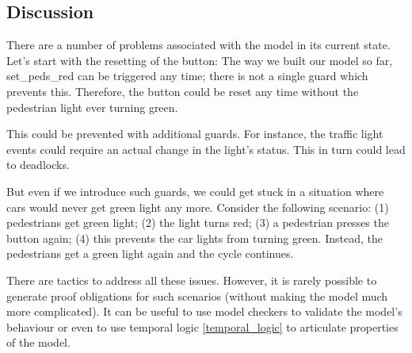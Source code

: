 \subsection{Discussion}
\label{tut_concepts_discussion2}

There are a number of problems associated with the model in its current state.  Let's start with the resetting of the button: The way we built our model so far, \textsf{set\_peds\_red} can be triggered any time; there is not a single guard which prevents this.  Therefore, the button could be reset any time without the pedestrian light ever turning green.

This could be prevented with additional guards. For instance, the traffic light events could require an actual change in the light's status.  This in turn could lead to deadlocks.

But even if we introduce such guards, we could get stuck in a situation where cars would never get green light any more.  Consider the following scenario: (1) pedestrians get green light; (2) the light turns red; (3) a pedestrian presses the button again; (4) this prevents the car lights from turning green. Instead, the pedestrians get a green light again and the cycle continues.

There are tactics to address all these issues.  However, it is rarely possible to generate proof obligations for such scenarios (without making the model much more complicated).  It can be useful to use model checkers to validate the model's behaviour or even to use temporal logic \ref{temporal_logic} to articulate properties of the model.



